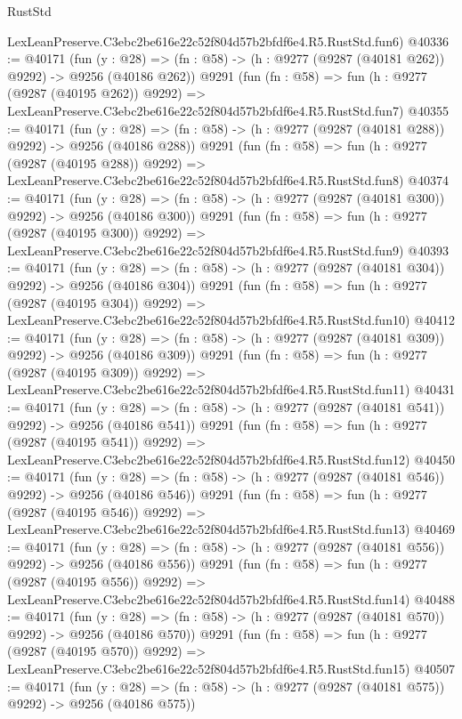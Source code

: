 \begin{lexlean}{RustStd}
\begin{coremodule}
    LexLeanPreserve.C3ebc2be616e22c52f804d57b2bfdf6e4.R5.RustStd.fun6)
@40336 := @40171
    (fun (y : @28) => (fn : @58) -> (h : @9277 (@9287 (@40181 @262)) @9292) -> @9256 (@40186 @262))
    @9291
    (fun (fn : @58) =>
    fun (h : @9277 (@9287 (@40195 @262)) @9292) =>
    LexLeanPreserve.C3ebc2be616e22c52f804d57b2bfdf6e4.R5.RustStd.fun7)
@40355 := @40171
    (fun (y : @28) => (fn : @58) -> (h : @9277 (@9287 (@40181 @288)) @9292) -> @9256 (@40186 @288))
    @9291
    (fun (fn : @58) =>
    fun (h : @9277 (@9287 (@40195 @288)) @9292) =>
    LexLeanPreserve.C3ebc2be616e22c52f804d57b2bfdf6e4.R5.RustStd.fun8)
@40374 := @40171
    (fun (y : @28) => (fn : @58) -> (h : @9277 (@9287 (@40181 @300)) @9292) -> @9256 (@40186 @300))
    @9291
    (fun (fn : @58) =>
    fun (h : @9277 (@9287 (@40195 @300)) @9292) =>
    LexLeanPreserve.C3ebc2be616e22c52f804d57b2bfdf6e4.R5.RustStd.fun9)
@40393 := @40171
    (fun (y : @28) => (fn : @58) -> (h : @9277 (@9287 (@40181 @304)) @9292) -> @9256 (@40186 @304))
    @9291
    (fun (fn : @58) =>
    fun (h : @9277 (@9287 (@40195 @304)) @9292) =>
    LexLeanPreserve.C3ebc2be616e22c52f804d57b2bfdf6e4.R5.RustStd.fun10)
@40412 := @40171
    (fun (y : @28) => (fn : @58) -> (h : @9277 (@9287 (@40181 @309)) @9292) -> @9256 (@40186 @309))
    @9291
    (fun (fn : @58) =>
    fun (h : @9277 (@9287 (@40195 @309)) @9292) =>
    LexLeanPreserve.C3ebc2be616e22c52f804d57b2bfdf6e4.R5.RustStd.fun11)
@40431 := @40171
    (fun (y : @28) => (fn : @58) -> (h : @9277 (@9287 (@40181 @541)) @9292) -> @9256 (@40186 @541))
    @9291
    (fun (fn : @58) =>
    fun (h : @9277 (@9287 (@40195 @541)) @9292) =>
    LexLeanPreserve.C3ebc2be616e22c52f804d57b2bfdf6e4.R5.RustStd.fun12)
@40450 := @40171
    (fun (y : @28) => (fn : @58) -> (h : @9277 (@9287 (@40181 @546)) @9292) -> @9256 (@40186 @546))
    @9291
    (fun (fn : @58) =>
    fun (h : @9277 (@9287 (@40195 @546)) @9292) =>
    LexLeanPreserve.C3ebc2be616e22c52f804d57b2bfdf6e4.R5.RustStd.fun13)
@40469 := @40171
    (fun (y : @28) => (fn : @58) -> (h : @9277 (@9287 (@40181 @556)) @9292) -> @9256 (@40186 @556))
    @9291
    (fun (fn : @58) =>
    fun (h : @9277 (@9287 (@40195 @556)) @9292) =>
    LexLeanPreserve.C3ebc2be616e22c52f804d57b2bfdf6e4.R5.RustStd.fun14)
@40488 := @40171
    (fun (y : @28) => (fn : @58) -> (h : @9277 (@9287 (@40181 @570)) @9292) -> @9256 (@40186 @570))
    @9291
    (fun (fn : @58) =>
    fun (h : @9277 (@9287 (@40195 @570)) @9292) =>
    LexLeanPreserve.C3ebc2be616e22c52f804d57b2bfdf6e4.R5.RustStd.fun15)
@40507 := @40171
    (fun (y : @28) => (fn : @58) -> (h : @9277 (@9287 (@40181 @575)) @9292) -> @9256 (@40186 @575))

\end{coremodule}
\end{lexlean}
